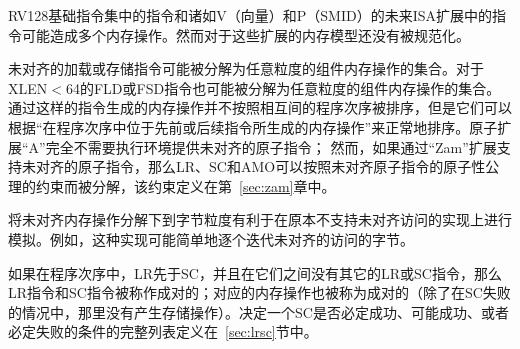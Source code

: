 \begin{commentary}
  RV128基础指令集中的指令和诸如V（向量）和P（SMID）的未来ISA扩展中的指令可能造成多个内存操作。然而对于这些扩展的内存模型还没有被规范化。
\end{commentary}

未对齐的加载或存储指令可能被分解为任意粒度的组件内存操作的集合。对于XLEN$<$64的FLD或FSD指令也可能被分解为任意粒度的组件内存操作的集合。
通过这样的指令生成的内存操作并不按照相互间的程序次序被排序，但是它们可以根据“在程序次序中位于先前或后续指令所生成的内存操作”来正常地排序。原子扩展“A”完全不需要执行环境提供未对齐的原子指令；
然而，如果通过“Zam”扩展支持未对齐的原子指令，那么LR、SC和AMO可以按照未对齐原子指令的原子性公理的约束而被分解，该约束定义在第~\ref{sec:zam}章中。

\begin{commentary}
  将未对齐内存操作分解下到字节粒度有利于在原本不支持未对齐访问的实现上进行模拟。例如，这种实现可能简单地逐个迭代未对齐的访问的字节。
\end{commentary}

如果在程序次序中，LR先于SC，并且在它们之间没有其它的LR或SC指令，那么LR指令和SC指令被称作成对的；对应的内存操作也被称为成对的（除了在SC失败的情况中，那里没有产生存储操作）。决定一个SC是否必定成功、可能成功、或者必定失败的条件的完整列表定义在~\ref{sec:lrsc}节中。

